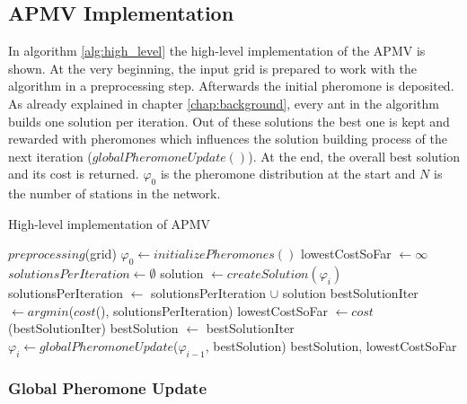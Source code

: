 \subsection{APMV Implementation}
In algorithm \ref{alg:high_level} the high-level implementation of the APMV is shown. At the very beginning, the input grid is prepared to work with the algorithm in a preprocessing step. Afterwards the initial pheromone is deposited. As already explained in chapter \ref{chap:background}, every ant in the algorithm builds one solution per iteration. Out of these solutions the best one is kept and rewarded with pheromones which influences the solution building process of the next iteration ($globalPheromoneUpdate()$). At the end, the overall best solution and its cost is returned. $\varphi_0$ is the pheromone distribution at the start and $N$ is the number of stations in the network.

\begin{algorithm}[h]
	\caption{High-level implementation of APMV}
	\label{alg:high_level}
	\begin{algorithmic}[1]
		\State $preprocessing$(grid) 
		\State $\varphi_0 \gets initializePheromones()$ 
		\State lowestCostSoFar $\gets \infty$ 
		\State $solutionsPerIteration \gets \emptyset$
		\State solution $\gets createSolution(\varphi_i)$
		\State solutionsPerIteration $\gets$ solutionsPerIteration $\cup$ solution
		\EndFor
		\State bestSolutionIter $\gets argmin$($cost$(), solutionsPerIteration)
		\State lowestCostSoFar $\gets cost$(bestSolutionIter)
		\State bestSolution $\gets$ bestSolutionIter
		\EndIf
		\State $\varphi_i \gets globalPheromoneUpdate$($\varphi_{i-1}$, bestSolution)
		\EndFor
		\State \Return bestSolution, lowestCostSoFar
	\end{algorithmic}
\end{algorithm}

\subsubsection{Global Pheromone Update}

